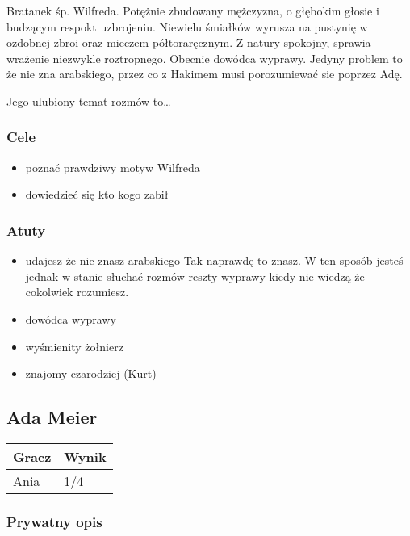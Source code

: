 \documentclass[11pt]{article}
\begin{document}
    Bratanek śp. Wilfreda. Potężnie zbudowany mężczyzna, o głębokim
    głosie i budzącym respokt uzbrojeniu. Niewielu śmiałków wyrusza
    na pustynię w ozdobnej zbroi oraz mieczem półtoraręcznym. Z
    natury spokojny, sprawia wrażenie niezwykle roztropnego. Obecnie
    dowódca wyprawy. Jedyny problem to że nie zna arabskiego, przez
    co z Hakimem musi porozumiewać sie poprzez Adę.

    Jego ulubiony temat rozmów to\ldots{}
\subsubsection*{Cele}
\label{sec-3.2.3}

\begin{itemize}
\item poznać prawdziwy motyw Wilfreda
\item dowiedzieć się kto kogo zabił
\end{itemize}
\subsubsection*{Atuty}
\label{sec-3.2.4}

\begin{itemize}
\item udajesz że nie znasz arabskiego
      Tak naprawdę to znasz. W ten sposób jesteś jednak w stanie
      słuchać rozmów reszty wyprawy kiedy nie wiedzą że cokolwiek
      rozumiesz.
\item dowódca wyprawy
\item wyśmienity żołnierz
\item znajomy czarodziej (Kurt)
\end{itemize}
\subsection*{Ada Meier}
\label{sec-3.3}


\begin{center}
\begin{tabular}{ll}
 Gracz  &  Wynik  \\
\hline
 Ania   &  1/4    \\
\end{tabular}
\end{center}


\subsubsection*{Prywatny opis}
\label{sec-3.3.1}
\end{document}
